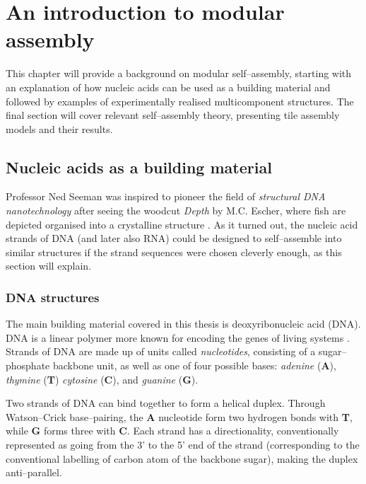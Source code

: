
\chapter{An introduction to modular assembly}
\label{ch:polycubes_intro}

\minitoc

This chapter will provide a background on modular self--assembly, starting with an explanation of how nucleic acids can be used as a building material and followed by examples of experimentally realised multicomponent structures. The final section will cover relevant self--assembly theory, presenting tile assembly models and their results.


\section{Nucleic acids as a building material}
Professor Ned Seeman was inspired to pioneer the field of \emph{structural DNA nanotechnology} after seeing the woodcut \emph{Depth} by M.C. Escher, where fish are depicted organised into a crystalline structure \cite{seeman_2016}. As it turned out, the nucleic acid strands of DNA (and later also RNA) could be designed to self--assemble into similar structures if the strand sequences were chosen cleverly enough, as this section will explain.

\subsection{DNA structures}

The main building material covered in this thesis is deoxyribonucleic acid (DNA). DNA is a linear polymer more known for encoding the genes of living systems \cite{calladine1997understanding}. Strands of DNA are made up of units called \emph{nucleotides}, consisting of a sugar--phosphate backbone unit, as well as one of four possible bases: \emph{adenine} (\textbf{A}), \emph{thymine} (\textbf{T}) \emph{cytosine} (\textbf{C}), and \emph{guanine} (\textbf{G}). 

Two strands of DNA can bind together to form a helical duplex. Through Watson--Crick base--pairing, the \textbf{A} nucleotide form two hydrogen bonds with \textbf{T}, while \textbf{G} forms three with \textbf{C}. Each strand has a directionality, conventionally represented as going from the 3' to the 5' end of the strand (corresponding to the conventional labelling of carbon atom of the backbone sugar), making the duplex anti--parallel.


